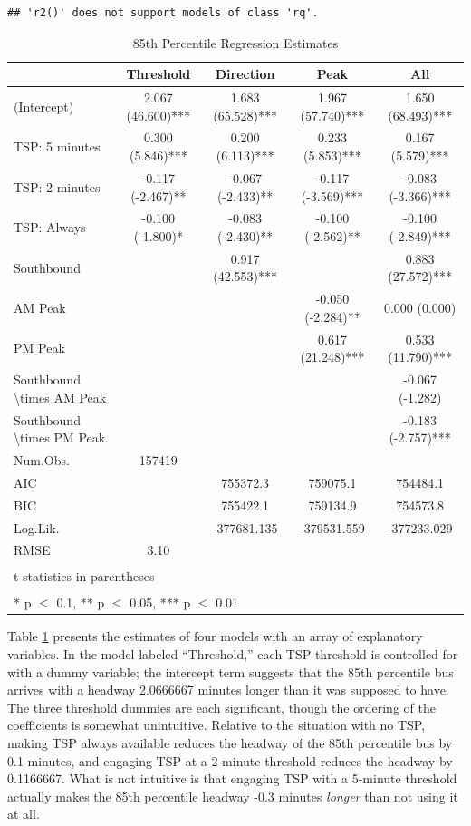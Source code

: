 \documentclass[3p, authoryear, review]{elsarticle} %
\begin{document}
\begin{verbatim}
## 'r2()' does not support models of class 'rq'.
\end{verbatim}

\begin{table}

\caption{\label{tab:models}85th Percentile Regression Estimates}
\centering
\begin{tabular}[t]{lcccc}
\toprule
  & Threshold & Direction & Peak & All\\
\midrule
(Intercept) & 2.067 (46.600)*** & 1.683 (65.528)*** & 1.967 (57.740)*** & 1.650 (68.493)***\\
TSP: 5 minutes & 0.300 (5.846)*** & 0.200 (6.113)*** & 0.233 (5.853)*** & 0.167 (5.579)***\\
TSP: 2 minutes & -0.117 (-2.467)** & -0.067 (-2.433)** & -0.117 (-3.569)*** & -0.083 (-3.366)***\\
TSP: Always & -0.100 (-1.800)* & -0.083 (-2.430)** & -0.100 (-2.562)** & -0.100 (-2.849)***\\
Southbound &  & 0.917 (42.553)*** &  & 0.883 (27.572)***\\
AM Peak &  &  & -0.050 (-2.284)** & 0.000 (0.000)\\
PM Peak &  &  & 0.617 (21.248)*** & 0.533 (11.790)***\\
Southbound \textbackslash{}times AM Peak &  &  &  & -0.067 (-1.282)\\
Southbound \textbackslash{}times PM Peak &  &  &  & -0.183 (-2.757)***\\
\midrule
Num.Obs. & 157419 &  &  & \\
AIC &  & 755372.3 & 759075.1 & 754484.1\\
BIC &  & 755422.1 & 759134.9 & 754573.8\\
Log.Lik. &  & -377681.135 & -379531.559 & -377233.029\\
RMSE & 3.10 &  &  & \\
\bottomrule
\multicolumn{5}{l}{\textsuperscript{} t-statistics in parentheses}\\
\multicolumn{5}{l}{\textsuperscript{} * p $<$ 0.1, ** p $<$ 0.05, *** p $<$ 0.01}\\
\end{tabular}
\end{table}

Table \ref{tab:models} presents the estimates of four models with an array
of explanatory variables. In the model labeled ``Threshold,'' each TSP threshold
is controlled for with a dummy variable; the intercept term suggests that the
85th percentile bus arrives with a headway 2.0666667
minutes longer than it was supposed to have. The three threshold dummies are
each significant, though the ordering of the coefficients is somewhat unintuitive.
Relative to the situation with no TSP, making TSP always available reduces the
headway of the 85th percentile bus by 0.1
minutes, and engaging TSP at a 2-minute threshold reduces the headway by
0.1166667. What is not intuitive is that
engaging TSP with a 5-minute threshold actually makes the 85th percentile
headway -0.3 minutes \emph{longer} than
not using it at all.
\end{document}
